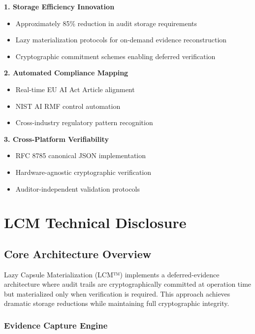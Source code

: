 \documentclass[12pt,a4paper]{article}
\begin{document}
\begin{valuebox}
\textbf{1. Storage Efficiency Innovation}
\begin{itemize}
\item Approximately 85\% reduction in audit storage requirements
\item Lazy materialization protocols for on-demand evidence reconstruction
\item Cryptographic commitment schemes enabling deferred verification
\end{itemize}

\textbf{2. Automated Compliance Mapping}
\begin{itemize}
\item Real-time EU AI Act Article alignment
\item NIST AI RMF control automation
\item Cross-industry regulatory pattern recognition
\end{itemize}

\textbf{3. Cross-Platform Verifiability}
\begin{itemize}
\item RFC 8785 canonical JSON implementation
\item Hardware-agnostic cryptographic verification
\item Auditor-independent validation protocols
\end{itemize}
\end{valuebox}

\section{LCM Technical Disclosure}

\subsection{Core Architecture Overview}

Lazy Capsule Materialization (LCM™) implements a deferred-evidence architecture where audit trails are cryptographically committed at operation time but materialized only when verification is required. This approach achieves dramatic storage reductions while maintaining full cryptographic integrity.

\subsubsection{Evidence Capture Engine}
\end{document}
